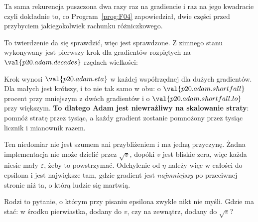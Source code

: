 \begin{fr}
Ta sama rekurencja puszczona dwa razy \dash{} raz na gradiencie i raz na jego
kwadracie \dash{} czyli dokładnie to, co Program~\ref{prog:F04} zapowiedział,
dwie części przed przybyciem jakiegokolwiek rachunku różniczkowego.

To twierdzenie da się sprawdzić, więc jest sprawdzone. Z zimnego stanu
wykonywany jest pierwszy krok dla gradientów rozpiętych na
$\val{p20.adam.decades}$ rzędach wielkości:


Krok wynosi $\val{p20.adam.eta}$ w każdej współrzędnej dla dużych gradientów.
Dla małych jest krótszy, i to nie tak samo w obu: o
$\val{p20.adam.shortfall}$ procent przy mniejszym z dwóch gradientów i o
$\val{p20.adam.shortfall.lo}$ przy większym.
\textbf{To dlatego Adam jest niewrażliwy na skalowanie straty}: pomnóż stratę
przez tysiąc, a każdy gradient zostanie pomnożony przez tysiąc \dash{} licznik i
mianownik razem.
\end{fr}

\begin{fr}
Ten niedomiar nie jest szumem ani przybliżeniem i ma jedną przyczynę. Żadna
implementacja nie może dzielić przez $\sqrt{v}$, dopóki $v$ jest bliskie
zera, więc każda niesie mały $\varepsilon$, żeby to powstrzymać. Odchylenie
od $\eta$ należy więc w całości do epsilona i jest największe tam, gdzie
gradient jest \emph{najmniejszy} \dash{} po przeciwnej stronie niż ta, o
którą ludzie się martwią.

Rodzi to pytanie, o którym przy pisaniu epsilona zwykle nikt nie myśli. Gdzie
ma stać: w środku pierwiastka, dodany do $v$, czy na zewnątrz, dodany do
$\sqrt{v}$?
\dotline
\nextframe
\end{fr}

